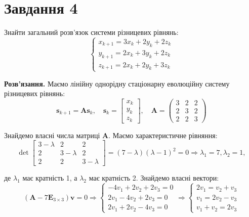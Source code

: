 \documentclass{hw_template}
\begin{document}
\pagebreak

\section{Завдання 4}

\begin{problem}
    Знайти загальний розв'язок системи різницевих рівнянь:
    \begin{equation*}
        \begin{cases}
            x_{k+1} = 3x_k + 2y_k + 2z_k \\
            y_{k+1} = 2x_k + 3y_k + 2z_k \\
            z_{k+1} = 2x_k + 2y_k + 3z_k
        \end{cases}
    \end{equation*}
\end{problem}

\textbf{Розв'язання.} Маємо лінійну однорідну стаціонарну еволюційну систему
різницевих рівнянь:
\begin{equation*}
    \boldsymbol{s}_{k+1} = \boldsymbol{A}\boldsymbol{s}_k, \quad \boldsymbol{s}_k = \begin{bmatrix} x_k \\ y_k \\ z_k \end{bmatrix}, \quad \boldsymbol{A} = \begin{pmatrix} 3 & 2 & 2 \\ 2 & 3 & 2 \\ 2 & 2 & 3 \end{pmatrix}
\end{equation*}

Знайдемо власні числа матриці $\boldsymbol{A}$. Маємо характеристичне рівняння:
\begin{equation*}
    \det \begin{bmatrix}
        3-\lambda & 2 & 2 \\
        2 & 3-\lambda & 2 \\
        2 & 2 & 3-\lambda
    \end{bmatrix} = (7-\lambda)(\lambda-1)^2 = 0 \Rightarrow \lambda_1 = 7, \lambda_2 = 1,
\end{equation*}

де $\lambda_1$ має кратність 1, а $\lambda_2$ має кратність 2. Знайдемо власні вектори:
\begin{equation*}
    (\boldsymbol{A}-7\boldsymbol{E}_{3 \times 3})\boldsymbol{v} = 0 \Rightarrow \begin{cases}
        -4v_1 + 2v_2 + 2v_3 = 0 \\
        2v_1 - 4v_2 + 2v_3 = 0 \\
        2v_1 + 2v_2 - 4v_3 = 0
    \end{cases} \Rightarrow \begin{cases}
        2v_1 = v_2 + v_3 \\
        v_1 = 2v_2 - v_3 \\
        v_1 + v_2 = 2v_3
    \end{cases}
\end{equation*}
\end{document}
